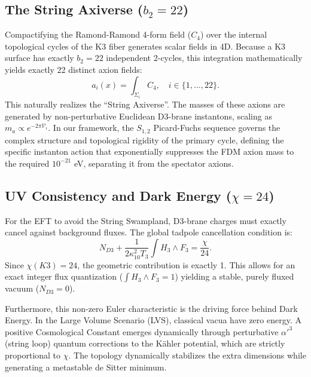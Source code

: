 \documentclass[11pt,a4paper]{article}
\begin{document}
\subsection{The String Axiverse ($b_2 = 22$)}
Compactifying the Ramond-Ramond 4-form field ($C_4$) over the internal topological cycles of the K3 fiber generates scalar fields in 4D. Because a K3 surface has exactly $b_2 = 22$ independent 2-cycles, this integration mathematically yields exactly 22 distinct axion fields:
\begin{equation}
    a_i(x) = \int_{\Sigma_i} C_4, \quad i \in \{1, \dots, 22\}.
\end{equation}
This naturally realizes the ``String Axiverse''. The masses of these axions are generated by non-perturbative Euclidean D3-brane instantons, scaling as $m_a \propto e^{-2\pi \mathcal{V}_i}$. In our framework, the $S_{1,2}$ Picard-Fuchs sequence governs the complex structure and topological rigidity of the primary cycle, defining the specific instanton action that exponentially suppresses the FDM axion mass to the required $10^{-21}$ eV, separating it from the spectator axions.

\subsection{UV Consistency and Dark Energy ($\chi = 24$)}
For the EFT to avoid the String Swampland, D3-brane charges must exactly cancel against background fluxes. The global tadpole cancellation condition is:
\begin{equation}
    N_{D3} + \frac{1}{2\kappa_{10}^2 T_3} \int H_3 \wedge F_3 = \frac{\chi}{24}.
\end{equation}
Since $\chi(K3) = 24$, the geometric contribution is exactly 1. This allows for an exact integer flux quantization ($\int H_3 \wedge F_3 = 1$) yielding a stable, purely fluxed vacuum ($N_{D3} = 0$).

Furthermore, this non-zero Euler characteristic is the driving force behind Dark Energy. In the Large Volume Scenario (LVS), classical vacua have zero energy. A positive Cosmological Constant emerges dynamically through perturbative $\alpha'^3$ (string loop) quantum corrections to the Kähler potential, which are strictly proportional to $\chi$. The topology dynamically stabilizes the extra dimensions while generating a metastable de Sitter minimum.
\end{document}
